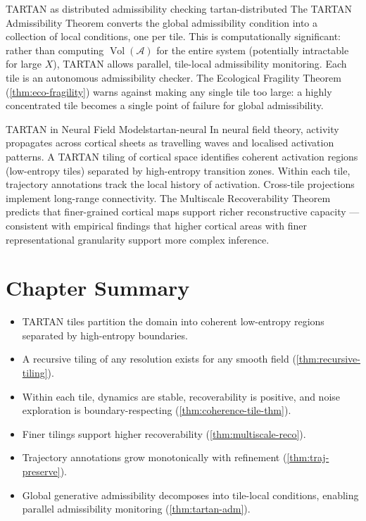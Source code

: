 \documentclass[12pt,twoside,openright]{book}
\newcommand{\bioicon}{\marginpar{\tiny\color{DistTeal}\faDna}}
\newcommand{\adm}{\mathcal{A}}
\newcommand{\Vol}{\operatorname{Vol}}
\newenvironment{chapsummary}{%
  \begin{tcolorbox}[colback=DistBlue!5,colframe=DistBlue,
    title={\faBookOpen\enspace Summary},
    fonttitle=\sffamily\bfseries\color{white},
    attach boxed title to top left={yshift=-2mm,xshift=4mm},
    boxed title style={colback=DistBlue,rounded corners}]
  \begin{itemize}[nosep,leftmargin=*]}{%
  \end{itemize}\end{tcolorbox}}
\begin{document}
\begin{remark}{TARTAN as distributed admissibility checking}%
  {tartan-distributed}
  The TARTAN Admissibility Theorem converts the global
  admissibility condition into a collection of local
  conditions, one per tile. This is computationally
  significant: rather than computing $\Vol(\adm)$ for
  the entire system (potentially intractable for large
  $X$), TARTAN allows parallel, tile-local admissibility
  monitoring. Each tile is an autonomous admissibility
  checker. The Ecological Fragility Theorem
  (\cref{thm:eco-fragility}) warns against making any
  single tile too large: a highly concentrated tile
  becomes a single point of failure for global
  admissibility.
\end{remark}

\begin{example}{TARTAN in Neural Field Models}{tartan-neural}
  \bioicon
  In neural field theory, activity propagates across
  cortical sheets as travelling waves and localised
  activation patterns. A TARTAN tiling of cortical space
  identifies coherent activation regions (low-entropy
  tiles) separated by high-entropy transition zones.
  Within each tile, trajectory annotations track the
  local history of activation. Cross-tile projections
  implement long-range connectivity. The Multiscale
  Recoverability Theorem predicts that finer-grained
  cortical maps support richer reconstructive capacity
  — consistent with empirical findings that higher
  cortical areas with finer representational granularity
  support more complex inference.
\end{example}

\section*{Chapter Summary}
\begin{chapsummary}
  \item TARTAN tiles partition the domain into coherent
        low-entropy regions separated by high-entropy
        boundaries.
  \item A recursive tiling of any resolution exists for
        any smooth field (\cref{thm:recursive-tiling}).
  \item Within each tile, dynamics are stable,
        recoverability is positive, and noise exploration
        is boundary-respecting
        (\cref{thm:coherence-tile-thm}).
  \item Finer tilings support higher recoverability
        (\cref{thm:multiscale-reco}).
  \item Trajectory annotations grow monotonically with
        refinement (\cref{thm:traj-preserve}).
  \item Global generative admissibility decomposes into
        tile-local conditions, enabling parallel
        admissibility monitoring
        (\cref{thm:tartan-adm}).
\end{chapsummary}
\end{document}
